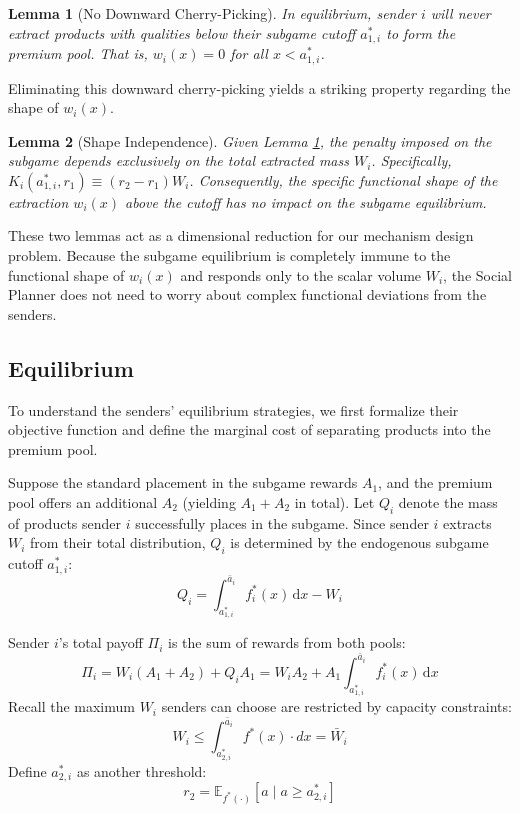 \documentclass[12pt, a4paper]{article}
\newtheorem{lemma}{Lemma}
\begin{document}
\begin{lemma}[No Downward Cherry-Picking]
\label{Lemma: No Cherry Picking}
In equilibrium, sender $i$ will never extract products with qualities below their subgame cutoff $a_{1,i}^*$ to form the premium pool. That is, $w_i(x) = 0$ for all $x < a_{1,i}^*$. 
\end{lemma}

Eliminating this downward cherry-picking yields a striking property regarding the shape of $w_i(x)$.

\begin{lemma}[Shape Independence]
\label{Lemma: Shape Independence}
Given Lemma \ref{Lemma: No Cherry Picking}, the penalty imposed on the subgame depends exclusively on the total extracted mass $W_i$. Specifically, $K_i(a_{1,i}^*, r_1) \equiv (r_2 - r_1)W_i$. Consequently, the specific functional shape of the extraction $w_i(x)$ above the cutoff has no impact on the subgame equilibrium. 
\end{lemma}

These two lemmas act as a dimensional reduction for our mechanism design problem. Because the subgame equilibrium is completely immune to the functional shape of $w_i(x)$ and responds only to the scalar volume $W_i$, the Social Planner does not need to worry about complex functional deviations from the senders. 

\subsection{Equilibrium}

To understand the senders' equilibrium strategies, we first formalize their objective function and define the marginal cost of separating products into the premium pool. 

Suppose the standard placement in the subgame rewards $A_1$, and the premium pool offers an additional $A_2$ (yielding $A_1 + A_2$ in total). Let $Q_i$ denote the mass of products sender $i$ successfully places in the subgame. Since sender $i$ extracts $W_i$ from their total distribution, $Q_i$ is determined by the endogenous subgame cutoff $a_{1,i}^*$:
$$Q_i = \int_{a_{1,i}^*}^{\bar{a}_i} f_i^*(x) \, \mathrm{d}x - W_i$$

Sender $i$'s total payoff $\Pi_i$ is the sum of rewards from both pools:
$$\Pi_i = W_i(A_1 + A_2) + Q_i A_1 = W_i A_2 + A_1 \int_{a_{1,i}^*}^{\bar{a}_i} f_i^*(x) \, \mathrm{d}x$$
Recall the maximum $W_i$ senders can choose are restricted by capacity constraints: 
\[W_i \leq \int_{a^*_{2,i}}^{\bar{a}_i}f^*(x)\cdot dx=\bar{W}_i\]
Define $a^*_{2,i}$ as another threshold:
\[r_2=\mathbb{E}_{f^*(\cdot)}[a \mid a \geq a^*_{2,i}]\]
\end{document}
